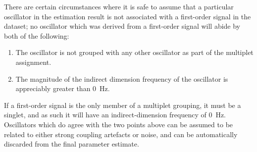 There are certain circumstances where it is safe to assume that a
particular oscillator in the estimation result is not associated with a
first-order signal in the dataset;
no oscillator which was derived from a first-order signal will abide by both of
the following:
\begin{enumerate}
    \item The oscillator is not grouped with any other oscillator as part of
        the multiplet assignment.
    \item The magnitude of the indirect dimension frequency of the oscillator
        is appreciably greater than \qty{0}{\hertz}.
\end{enumerate}
If a first-order signal is the only
member of a multiplet grouping, it must be a singlet, and as such it will have
an indirect-dimension frequency of \qty{0}{\hertz}. Oscillators which do agree
with the two points above can be assumed to be related to either strong
coupling artefacts or noise, and can be automatically discarded from the final
parameter estimate.

\label{corr:coupling-constants}
